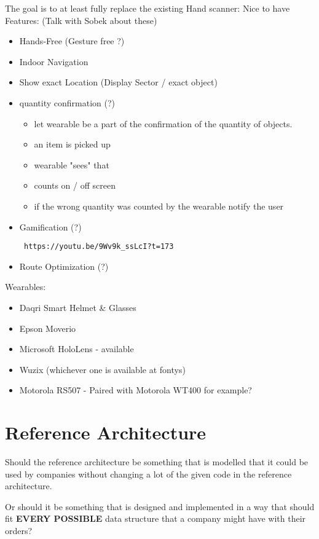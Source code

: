\documentclass{report}
\begin{document}
The goal is to at least fully replace the existing Hand scanner:
Nice to have Features: (Talk with Sobek about these)
\begin{itemize}
	\item Hands-Free (Gesture free ?)
	\item Indoor Navigation
	\item Show exact Location (Display Sector / exact object)
	\item quantity confirmation (?)
	\begin{itemize}
		\item let wearable be a part of the confirmation of the quantity of objects.
		\item an item is picked up
		\item wearable "sees" that
		\item counts on / off screen
		\item if the wrong quantity was counted by the wearable notify the user
	\end{itemize}
	\item Gamification (?) \begin{verbatim} https://youtu.be/9Wv9k_ssLcI?t=173 \end{verbatim}
	\item Route Optimization (?)
\end{itemize}

Wearables:
\begin{itemize}
	\item Daqri Smart Helmet \& Glasses
	\item Epson Moverio
	\item Microsoft HoloLens - available
	\item Wuzix (whichever one is available at fontys)
	\item Motorola RS507 - Paired with Motorola WT400 for example?
\end{itemize}

\chapter{Reference Architecture}
Should the reference architecture be something that is modelled that it could be used by companies without changing a lot of the given code in the reference architecture. 

Or should it be something that is designed and implemented in a way that should fit \textbf{EVERY POSSIBLE} data structure that a company might have with their orders?
\end{document}
